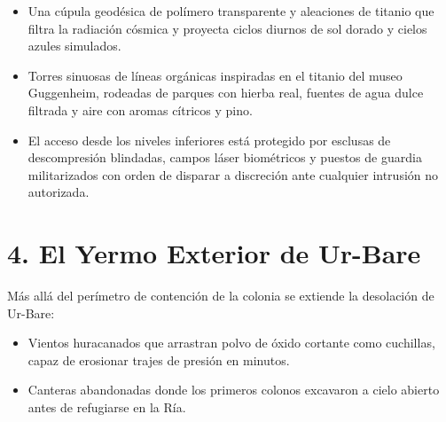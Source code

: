 \begin{itemize}
  \item {} Una cúpula geodésica de polímero transparente y aleaciones de titanio que filtra la radiación cósmica y proyecta ciclos diurnos de sol dorado y cielos azules simulados.
  \item {} Torres sinuosas de líneas orgánicas inspiradas en el titanio del museo Guggenheim, rodeadas de parques con hierba real, fuentes de agua dulce filtrada y aire con aromas cítricos y pino.
  \item {} El acceso desde los niveles inferiores está protegido por esclusas de descompresión blindadas, campos láser biométricos y puestos de guardia militarizados con orden de disparar a discreción ante cualquier intrusión no autorizada.
\end{itemize}

\section{4. El Yermo Exterior de Ur-Bare}

Más allá del perímetro de contención de la colonia se extiende la desolación de Ur-Bare:
\begin{itemize}
  \item {} Vientos huracanados que arrastran polvo de óxido cortante como cuchillas, capaz de erosionar trajes de presión en minutos.
  \item {} Canteras abandonadas donde los primeros colonos excavaron a cielo abierto antes de refugiarse en la Ría.
\end{itemize}
